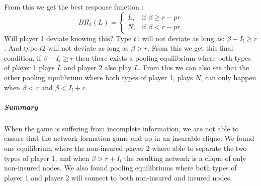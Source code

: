 From this we get the best response function :
\begin{equation}
BR_{2}(L)=
\begin{cases}
	L,& \text{if } \beta\geq r-pr\\
   N,& \text{if } \beta<r-pr  
\end{cases}
\end{equation}
Will player 1 deviate knowing this?
Type $t1$ will not deviate as long as: $\beta - I_{l} \geq r$. And type $t2$ will not deviate as long as $\beta >r$.
From this we get this final condition, if $\beta-I_{l}\geq r$ then there exists a pooling equilibrium where both types of player 1 plays $L$ and player 2 also play $L$.
From this we can also see that the other pooling equilibrium where both types of player 1, plays $N$, can only happen when $\beta<r \text{ and } \beta<I_l+r$.

\subparagraph{Summary}
When the game is suffering from incomplete information, we are not able to ensure that the network formation game end up in an insurable clique. We found one equilibrium where the non-insured player 2 where able to separate the two types of player 1, and when $\beta>r+I_{l}$ the resulting network is a clique of only non-insured nodes.
We also found pooling equilibriums where both types of player 1 and player 2 will connect to both non-insured and insured nodes. 
